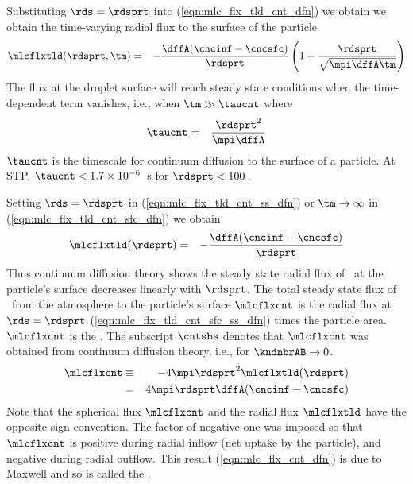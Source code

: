 \documentclass[12pt,twoside]{book}
\begin{document}
Substituting $\rds = \rdsprt$ into (\ref{eqn:mlc_flx_tld_cnt_dfn})
we obtain we obtain the time-varying radial flux to the surface of the
particle
\begin{eqnarray}
\mlcflxtld(\rdsprt,\tm) & = & 
- \frac{\dffA ( \cncinf - \cncsfc )}{\rdsprt } 
\left( 1 + \frac{\rdsprt}{\sqrt { \mpi \dffA \tm } } \right)
\label{eqn:mlc_flx_tld_cnt_sfc_dfn}
\end{eqnarray}
The flux at the droplet surface will reach steady state conditions
when the time-dependent term vanishes, i.e., when $\tm \gg \taucnt$
where 
\begin{eqnarray}
\taucnt & = & \frac{\rdsprt^{2}}{ \mpi \dffA }
\label{eqn:tau_cnt_dfn}
\end{eqnarray}
$\taucnt$ is the timescale for continuum diffusion to the surface of a
particle. 
At STP, $\taucnt < 1.7 \times 10^{-6}$~s for $\rdsprt < 100$\,\um.

Setting $\rds = \rdsprt$ in (\ref{eqn:mlc_flx_tld_cnt_ss_dfn}) or 
$\tm \rightarrow \infty$ in (\ref{eqn:mlc_flx_tld_cnt_sfc_dfn}) we obtain
\begin{eqnarray}
\mlcflxtld(\rdsprt) & = & - \frac{\dffA ( \cncinf - \cncsfc )}{\rdsprt }
\label{eqn:mlc_flx_tld_cnt_sfc_ss_dfn}
\end{eqnarray}
Thus continuum diffusion theory shows the steady state radial flux of
\A\ at the particle's surface decreases linearly with $\rdsprt$.
The total steady state flux of \A\ from the atmosphere to the
particle's surface $\mlcflxcnt$ is the radial flux at $\rds = \rdsprt$  
(\ref{eqn:mlc_flx_tld_cnt_sfc_ss_dfn}) times the particle area. 
$\mlcflxcnt$ is the .
The subscript $\cntsbs$ denotes that $\mlcflxcnt$ was obtained from
continuum diffusion theory, i.e., for $\kndnbrAB \rightarrow 0$.  
\begin{eqnarray}
\mlcflxcnt & \equiv & - 4 \mpi \rdsprt^{2} \mlcflxtld(\rdsprt) \nonumber \\
& = & 4 \mpi \rdsprt \dffA ( \cncinf - \cncsfc )
\label{eqn:mlc_flx_cnt_dfn}
\end{eqnarray}
Note that the spherical flux $\mlcflxcnt$ and the radial flux
$\mlcflxtld$ have the opposite sign convention. 
The factor of negative one was imposed so that $\mlcflxcnt$ is
positive during radial inflow (net uptake by the particle), and
negative during radial outflow.  
This result (\ref{eqn:mlc_flx_cnt_dfn}) is due to Maxwell and so is
called the .
\end{document}

